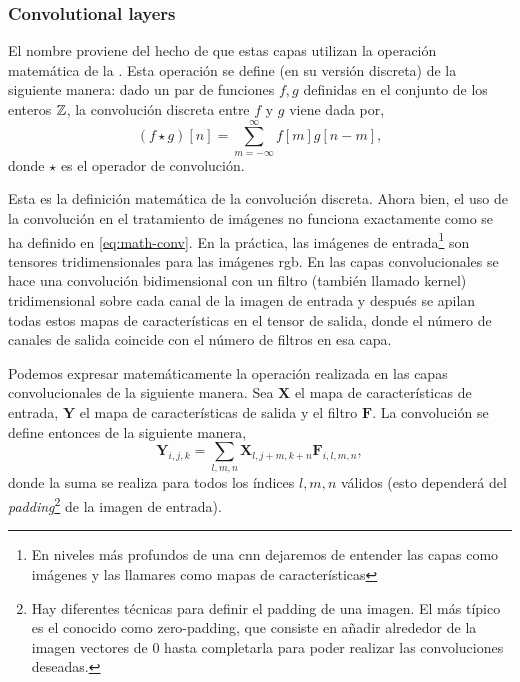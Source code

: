 \subsubsection{Convolutional layers}
El nombre proviene del hecho de que estas capas utilizan la operación
matemática de la
. Esta operación
se define (en su versión discreta) de la siguiente manera: dado un par de
funciones \(f, g\) definidas en el conjunto de los enteros \(\mathbb{Z}\), la
convolución discreta entre \(f\) y \(g\) viene dada por,
\begin{equation} \label{eq:math-conv}
  (f \star g)[n] = \sum_{m=-\infty}^{\infty} f[m]g[n - m],
\end{equation}
donde \(\star\) es el operador de convolución.

Esta es la definición matemática de la convolución discreta. Ahora bien, el uso
de la convolución en el tratamiento de imágenes no funciona exactamente como se
ha definido en \vref{eq:math-conv}. En la práctica, las imágenes de
entrada\footnote{En niveles más profundos de una \gls{cnn} dejaremos de
  entender las capas como imágenes y las llamares como mapas de
  características} son tensores tridimensionales para las imágenes
\acrshort{rgb}. En las capas convolucionales se hace una convolución
bidimensional con un filtro (también llamado kernel) tridimensional sobre cada
canal de la imagen de entrada y después se apilan todas estos mapas de
características en el tensor de salida, donde el número de canales de salida
coincide con el número de filtros en esa capa.

Podemos expresar matemáticamente la operación realizada en las capas
convolucionales de la siguiente manera. Sea \(\mathbf{X}\) el
mapa de características de entrada, \(\mathbf{Y}\) el mapa de características
de salida y el filtro \(\mathbf{F}\). La convolución se define entonces de la
siguiente manera,
\begin{equation} \label{eq:convolution}
  \mathbf{Y}_{i, j, k} =
  \sum_{l, m, n} \mathbf{X}_{l, j + m, k + n}\mathbf{F}_{i, l, m, n},
\end{equation}
donde la suma se realiza para todos los índices \(l, m, n\) válidos (esto
dependerá del \emph{padding}\footnote{Hay diferentes técnicas para definir el
  padding de una imagen. El más típico es el conocido como zero-padding, que
  consiste en añadir alrededor de la imagen vectores de 0 hasta completarla
  para poder realizar las convoluciones deseadas.} de la imagen de entrada).


